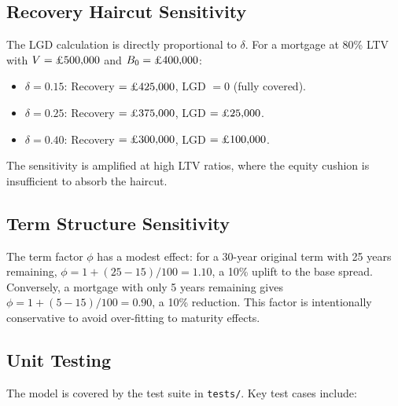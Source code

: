 \documentclass[11pt,a4paper]{article}
\begin{document}
\subsection{Recovery Haircut Sensitivity}

The LGD calculation is directly proportional to $\delta$. For a mortgage at 80\% LTV
with $V = \text{\pounds}500{,}000$ and $B_0 = \text{\pounds}400{,}000$:
\begin{itemize}[nosep]
    \item $\delta = 0.15$: Recovery $= \text{\pounds}425{,}000$, LGD $= 0$ (fully covered).
    \item $\delta = 0.25$: Recovery $= \text{\pounds}375{,}000$, LGD $= \text{\pounds}25{,}000$.
    \item $\delta = 0.40$: Recovery $= \text{\pounds}300{,}000$, LGD $= \text{\pounds}100{,}000$.
\end{itemize}

\noindent The sensitivity is amplified at high LTV ratios, where the equity cushion is
insufficient to absorb the haircut.

\subsection{Term Structure Sensitivity}

The term factor $\phi$ has a modest effect: for a 30-year original term with 25 years
remaining, $\phi = 1 + (25 - 15)/100 = 1.10$, a 10\% uplift to the base spread.
Conversely, a mortgage with only 5 years remaining gives $\phi = 1 + (5 - 15)/100 = 0.90$,
a 10\% reduction. This factor is intentionally conservative to avoid over-fitting to
maturity effects.

\mkmvalidation

\subsection{Unit Testing}

The model is covered by the test suite in \texttt{tests/}. Key test cases include:
\end{document}
